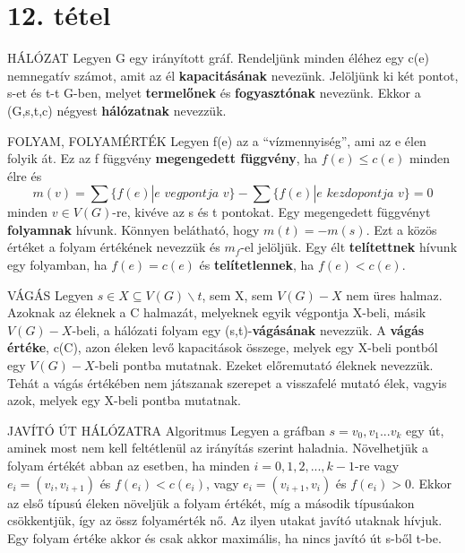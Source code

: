 \section{12. tétel}

\begin{definicio}{HÁLÓZAT}
Legyen G egy irányított gráf. Rendeljünk minden éléhez egy c(e) nemnegatív számot, amit az él \textbf{kapacitásának} nevezünk. Jelöljünk ki két pontot, s-et és t-t G-ben, melyet \textbf{termelőnek} és \textbf{fogyasztónak} nevezünk. Ekkor a (G,s,t,c) négyest \textbf{hálózatnak} nevezzük.
\end{definicio}

\begin{definicio}{FOLYAM, FOLYAMÉRTÉK}
Legyen f(e) az a ``vízmennyiség'', ami az e élen folyik át. Ez az f függvény \textbf{megengedett függvény}, ha $f(e) \leq c(e)$ minden élre és
$$m(v) = \sum\{f(e)|e\,\,vegpontja\,\,v\} - \sum\{f(e) | e\,\,kezdopontja\,\,v\} = 0$$
minden $v\in V(G)$-re, kivéve az s és t pontokat. Egy megengedett függvényt \textbf{folyamnak} hívunk. Könnyen belátható, hogy $m(t) = -m(s)$. Ezt a közös értéket a folyam értékének nevezzük és $m_f$-el jelöljük. Egy élt \textbf{telítettnek} hívunk egy folyamban, ha $f(e) = c(e)$ és \textbf{telítetlennek}, ha $f(e) < c(e)$.
\end{definicio}

\begin{definicio}{VÁGÁS}
Legyen $s \in X \subseteq V(G) \backslash {t}$, sem X, sem $V(G) - X$ nem üres halmaz. Azoknak az éleknek a C halmazát, melyeknek egyik végpontja X-beli, másik $V(G) - X$-beli, a hálózati folyam egy (s,t)-\textbf{vágásának} nevezzük. A \textbf{vágás értéke}, c(C), azon éleken levő kapacitások összege, melyek egy X-beli pontból egy $V(G) - X$-beli pontba mutatnak. Ezeket előremutató éleknek nevezzük. Tehát a vágás értékében nem játszanak szerepet a visszafelé mutató élek, vagyis azok, melyek egy X-beli pontba mutatnak.
\end{definicio}

\begin{tetel}{JAVÍTÓ ÚT HÁLÓZATRA Algoritmus}
Legyen a gráfban $s = v_0, v_1... v_k$ egy út, aminek most nem kell feltétlenül az irányítás szerint haladnia. Növelhetjük a folyam értékét abban az esetben, ha minden $i = 0,1,2,...,k-1$-re vagy $e_i = (v_i , v_{i + 1})$ és $f(e_i) < c(e_i) $, vagy $e_i = (v_{i + 1} , v_i )$ és $f(e_i) > 0 $.
Ekkor az első típusú éleken növeljük a folyam értékét, míg a második típusúakon csökkentjük, így az össz folyamérték nő. Az ilyen utakat javító utaknak hívjuk.\\ Egy folyam értéke akkor és csak akkor maximális, ha nincs javító út s-ből t-be.
\end{tetel}

